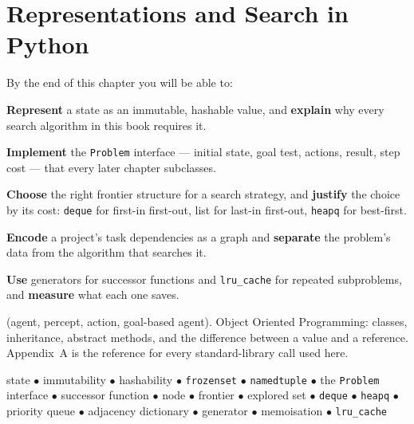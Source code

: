 \chapter{Representations and Search in Python}\label{ch:python}

\begin{outcomes}
By the end of this chapter you will be able to:
\begin{tight}
  \item \textbf{Represent} a state as an immutable, hashable value, and
        \textbf{explain} why every search algorithm in this book requires it.
  \item \textbf{Implement} the \texttt{Problem} interface --- initial state, goal
        test, actions, result, step cost --- that every later chapter subclasses.
  \item \textbf{Choose} the right frontier structure for a search strategy, and
        \textbf{justify} the choice by its cost: \texttt{deque} for first-in
        first-out, list for last-in first-out, \texttt{heapq} for best-first.
  \item \textbf{Encode} a project's task dependencies as a graph and
        \textbf{separate} the problem's data from the algorithm that searches it.
  \item \textbf{Use} generators for successor functions and \texttt{lru\_cache}
        for repeated subproblems, and \textbf{measure} what each one saves.
\end{tight}
\end{outcomes}

\begin{prereq}
 (agent, percept, action, goal-based agent). Object Oriented
Programming: classes, inheritance, abstract methods, and the difference between a
value and a reference. Appendix~A is the reference for every standard-library call
used here.
\end{prereq}

\begin{keyterms}
state $\bullet$ immutability $\bullet$ hashability $\bullet$ \texttt{frozenset}
$\bullet$ \texttt{namedtuple} $\bullet$ the \texttt{Problem} interface $\bullet$
successor function $\bullet$ node $\bullet$ frontier $\bullet$ explored set
$\bullet$ \texttt{deque} $\bullet$ \texttt{heapq} $\bullet$ priority queue
$\bullet$ adjacency dictionary $\bullet$ generator $\bullet$ memoisation $\bullet$
\texttt{lru\_cache}
\end{keyterms}

